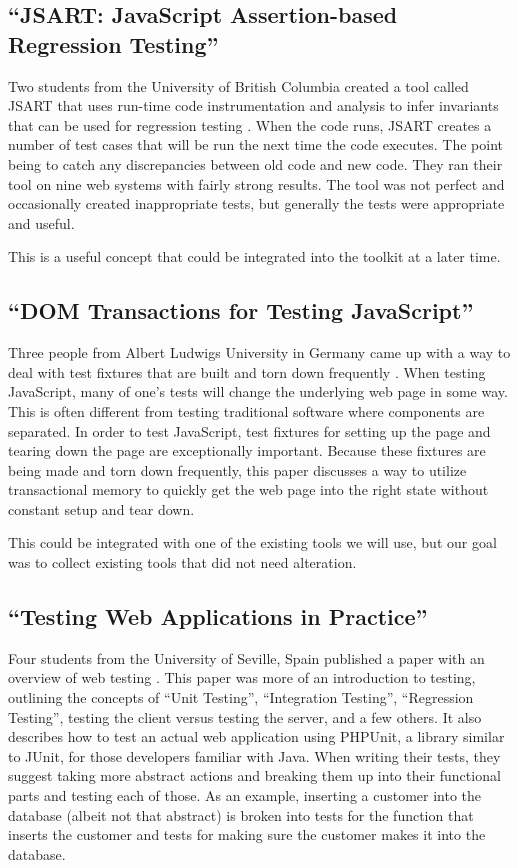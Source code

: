 \documentclass[12pt]{ucthesis}
\begin{document}
\subsection{``JSART: JavaScript Assertion-based Regression Testing''}
Two students from the University of British Columbia created a tool called JSART that uses run-time code instrumentation and analysis to infer invariants that can be used for regression testing \cite{JSART}. When the code runs, JSART creates a number of test cases that will be run the next time the code executes. The point being to catch any discrepancies between old code and new code. They ran their tool on nine web systems with fairly strong results. The tool was not perfect and occasionally created inappropriate tests, but generally the tests were appropriate and useful.

This is a useful concept that could be integrated into the toolkit at a later time.

\subsection{``DOM Transactions for Testing JavaScript''}
Three people from Albert Ludwigs University in Germany came up with a way to deal with test fixtures that are built and torn down frequently \cite{DOMTransactions}. When testing JavaScript, many of one's tests will change the underlying web page in some way. This is often different from testing traditional software where components are separated. In order to test JavaScript, test fixtures for setting up the page and tearing down the page are exceptionally important. Because these fixtures are being made and torn down frequently, this paper discusses a way to utilize transactional memory to quickly get the web page into the right state without constant setup and tear down.

This could be integrated with one of the existing tools we will use, but our goal was to collect existing tools that did not need alteration.

\subsection{``Testing Web Applications in Practice''}
Four students from the University of Seville, Spain published a paper with an overview of web testing \cite{TestingInPractice}. This paper was more of an introduction to testing, outlining the concepts of “Unit Testing”, “Integration Testing”, “Regression Testing”, testing the client versus testing the server, and a few others. It also describes how to test an actual web application using PHPUnit, a library similar to JUnit, for those developers familiar with Java. When writing their tests, they suggest taking more abstract actions and breaking them up into their functional parts and testing each of those. As an example, inserting a customer into the database (albeit not that abstract) is broken into tests for the function that inserts the customer and tests for making sure the customer makes it into the database.
\end{document}
